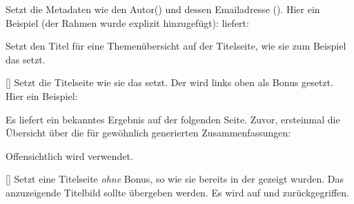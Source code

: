 %
%

Setzt die Metadaten wie den Autor() und dessen Emailadresse (). Hier ein Beispiel (der Rahmen wurde explizit hinzugefügt):  liefert:\smallskip\\
\framebox{\LILLYxPHILOSOPHERxMETADATA}

%
%
%

Setzt den Titel für eine Themenübersicht auf der Titelseite, wie sie zum Beispiel das  setzt.

%
%
%

[\secline{}\secline{}\secline{}]
Setzt die Titelseite wie sie das  setzt. Der  wird links oben als Bonus gesetzt. Hier ein Beispiel:
Es liefert ein bekanntes Ergebnis auf der folgenden Seite. Zuvor, ersteinmal die Übersicht über die für gewöhnlich generierten Zusammenfassungen:
\begin{tcbraster}[raster columns=4, blankest,graphics pages={9,...,16},colback=white]
\end{tcbraster}
{
\def\LILLYxFACULTY{\LILLYxFACULTYxMATHE}
\def\LILLYxFACULTYxCOLOR{FacultyMathexColor}
\def\LILLYxVorlesung{ANA1}
}
Offensichtlich wird  verwendet.

%
%
%

[]
Setzt eine Titelseite \emph{ohne} Bonus, so wie sie bereits in der  gezeigt wurden. Das anzuzeigende Titelbild sollte übergeben werden. Es wird auf  und  zurückgegriffen.

